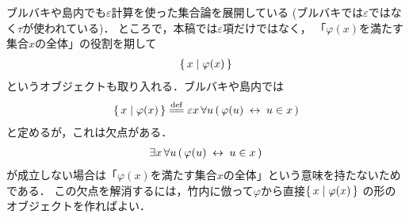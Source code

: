 	ブルバキ\cite{key5}や島内\cite{key6}でも$\varepsilon$計算を使った集合論を展開している
	(ブルバキ\cite{key5}では$\varepsilon$ではなく$\tau$が使われている)．
	ところで，本稿では$\varepsilon$項だけではなく，
	「$\varphi(x)$を満たす集合$x$の全体」の役割を期して
	\begin{align}
		\left\{\, x \mid \varphi(x)\, \right\}
	\end{align}
	というオブジェクトも取り入れる．ブルバキ\cite{key5}や島内\cite{key6}では
	\begin{align}
		\Set{x}{\varphi(x)} \defeq \varepsilon x\, \forall u\, 
		(\, \varphi(u) \lrarrow u \in x\, )
	\end{align}
	と定めるが，これは欠点がある．
	\begin{align}
		\exists x\, \forall u\, (\, \varphi(u) \hspace{0.25em}\leftrightarrow\hspace{0.25em} u \in x\, )
	\end{align}
	が成立しない場合は「$\varphi(x)$を満たす集合$x$の全体」という意味を持たないためである．
	この欠点を解消するには，竹内\cite{key4}に倣って$\varphi$から直接$\left\{\, x \mid \varphi(x)\, \right\}$
	の形のオブジェクトを作ればよい．
	
